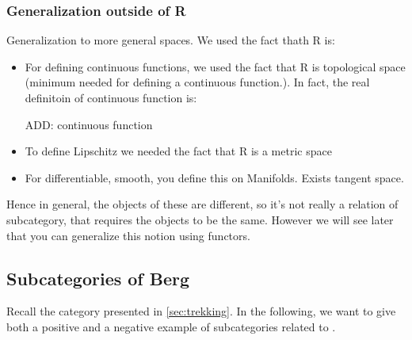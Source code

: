 {\subsubsection{Generalization outside of R}
Generalization to more general spaces. 
We used the fact thath R is:
\begin{itemize}
\item For defining continuous functions, we used the fact that R is topological space (minimum needed for defining a continuous function.). In fact, the real definitoin of continuous function is: 

ADD: continuous function

\item To define Lipschitz we needed the fact that R is a metric space 
\item For differentiable, smooth, you define this on Manifolds. Exists tangent space. 
\end{itemize}
     
Hence in general, the objects of these are different, so it's not really a relation of subcategory, that requires
the objects to be the same. However we will see later that you can generalize this notion using functors. 

}



\subsection{Subcategories of Berg}
\label{sec:subcat_berg}
Recall the category \Berg presented in \cref{sec:trekking}. In the following, we want to give both a positive and a negative example of subcategories related to \Berg.



